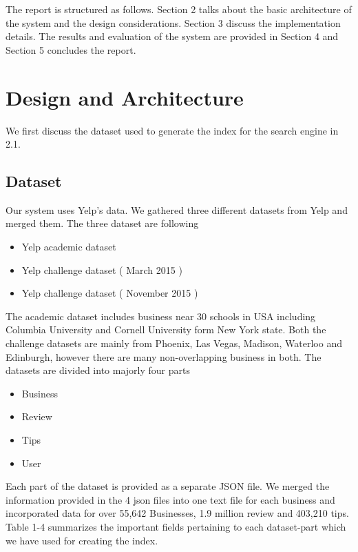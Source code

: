 \documentclass[paper=letter, fontsize=15pt]{article} %
\begin{document}
The report is structured as follows. Section 2 talks about the basic architecture of the system and the design considerations. Section 3 discuss the implementation details. The results and evaluation of the system are provided in Section 4 and Section 5 concludes the report.


\section{Design and Architecture}
We first discuss the dataset used to generate the index for the search engine in 2.1.

\subsection{Dataset}

Our system uses Yelp's data. We gathered three different datasets from Yelp and merged them. The three dataset are following
\begin{itemize}
\item Yelp academic dataset
\item Yelp challenge dataset ( March 2015 )
\item Yelp challenge dataset ( November 2015 )
\end{itemize}
The academic dataset includes business near 30 schools in USA including Columbia University and Cornell University form New York state.
Both the challenge datasets are mainly from Phoenix, Las Vegas, Madison, Waterloo and Edinburgh, however there are many non-overlapping business in both.
The datasets are divided into majorly four parts
\begin{itemize}
\item Business
\item Review
\item Tips
\item User
\end{itemize}
Each part of the dataset is provided as a separate JSON file. We merged the information provided in the 4 json files into one text file for each business and incorporated data for over 55,642 Businesses, 1.9 million review and 403,210 tips. Table 1-4 summarizes the important fields pertaining to each dataset-part which we have used for creating the index.
\end{document}
